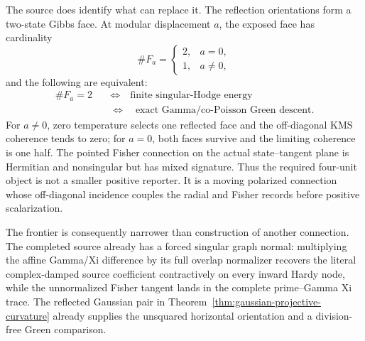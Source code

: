 \documentclass[11pt]{article}
\theoremstyle{definition}
\theoremstyle{remark}
\begin{document}
The source does identify what can replace it.  The reflection orientations
form a two-state Gibbs face.  At modular displacement \(a\), the exposed face
has cardinality
\[
                  \#F_a=\begin{cases}2,&a=0,\\1,&a\ne0,
                  \end{cases}
\tag{4.17H}\label{eq:reflection-face-cardinality}
\]
and the following are equivalent:
\[
 \begin{aligned}
 \#F_a=2
 &\quad\Longleftrightarrow\quad
 \text{finite singular-Hodge energy}\\
 &\quad\Longleftrightarrow\quad
 \text{exact Gamma/co-Poisson Green descent}.
 \end{aligned}
\tag{4.17I}\label{eq:kms-hodge-green-equivalence}
\]
For \(a\ne0\), zero temperature selects one reflected face and the
off-diagonal KMS coherence tends to zero; for \(a=0\), both faces survive
and the limiting coherence is one half.  The pointed Fisher connection on
the actual state--tangent plane is Hermitian and nonsingular but has mixed
signature.  Thus the required four-unit object is not a smaller positive
reporter.  It is a moving polarized connection whose off-diagonal incidence
couples the radial and Fisher records before positive scalarization.

The frontier is consequently narrower than construction of another
connection.  The completed source already has a forced singular graph
normal: multiplying the affine Gamma/Xi difference by its full overlap
normalizer recovers the literal complex-damped source coefficient
contractively on every inward Hardy node, while the unnormalized Fisher
tangent lands in the complete prime--Gamma Xi trace.  The reflected Gaussian
pair in Theorem~\ref{thm:gaussian-projective-curvature} already supplies the
unsquared horizontal orientation and a division-free Green comparison.
\end{document}
